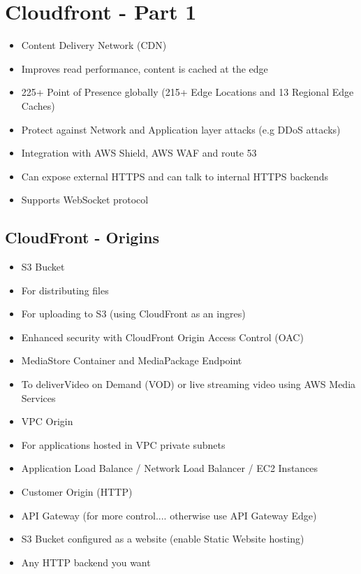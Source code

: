 \section{Cloudfront - Part 1}
\begin{itemize}
    \item Content Delivery Network (CDN)
    \item Improves read performance, content is cached at the edge
    \item 225+ Point of Presence globally (215+ Edge Locations and 13 Regional Edge Caches)
    \item Protect against Network and Application layer attacks (e.g DDoS attacks)
    \item Integration with AWS Shield, AWS WAF and route 53
    \item Can expose external HTTPS and can talk to internal HTTPS backends
    \item Supports WebSocket protocol
\end{itemize}

\subsection{CloudFront - Origins}
\begin{itemize}
    \item S3 Bucket
    \item For distributing files
    \item For uploading to S3 (using CloudFront as an ingres)
    \item Enhanced security with CloudFront Origin Access Control (OAC)
    \item MediaStore Container and MediaPackage Endpoint
    \item To deliverVideo on Demand (VOD) or live streaming video using AWS Media Services
    \item VPC Origin
    \item For applications hosted in VPC private subnets
    \item Application Load Balance / Network Load Balancer / EC2 Instances
    \item Customer Origin (HTTP)
    \item API Gateway (for more control.... otherwise use API Gateway Edge)
    \item S3 Bucket configured as a website (enable Static Website hosting)
    \item Any HTTP backend you want
\end{itemize}

